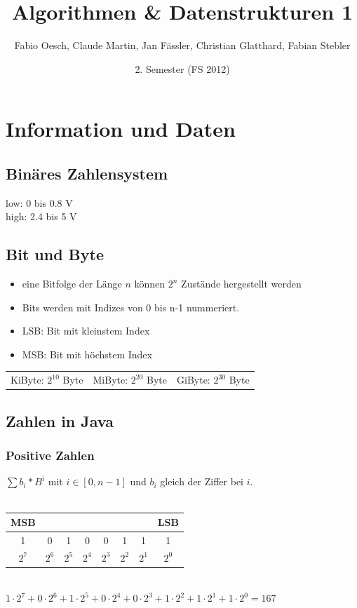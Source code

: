 \documentclass[a4paper,10pt]{article}
\author{Fabio Oesch, Claude Martin, Jan F\"assler, Christian Glatthard, Fabian Stebler}
\title{Algorithmen \& Datenstrukturen 1}
\date{2. Semester (FS 2012)}
\begin{document}
\maketitle
\thispagestyle{fancy}

\newpage


\tableofcontents	  	


\newpage
\setcounter{page}{1}

\section{Information und Daten}
\subsection{Bin\"ares Zahlensystem}
low: 0 bis 0.8 V\\
high: 2.4 bis 5 V\\
\subsection{Bit und Byte}
\begin{itemize}
\item eine Bitfolge der L\"ange $n$ k\"onnen $2^n$ Zust\"ande hergestellt werden
\item Bits werden mit Indizes von 0 bis n-1 nummeriert.
\item LSB: Bit mit kleinstem Index
\item MSB: Bit mit h\"ochstem Index
\end{itemize}
\begin{tabular}{l l l }
	KiByte: $2^{10}$ Byte &
	MiByte: $2^{20}$ Byte &
	GiByte: $2^{30}$ Byte
\end{tabular}

\subsection{Zahlen in Java}
\subsubsection{Positive Zahlen}
$\sum {b_i * B^i}$ mit $i \in [0,n-1]$ und $b_i$ gleich der Ziffer bei $i$. \\\\
\begin{tabular}{|c|c|c|c|c|c|c|c|}
\multicolumn{1}{c}{MSB}&\multicolumn{6}{c}{}&\multicolumn{1}{c}{LSB}\\ \hline
1&0&1&0&0&1&1&1\\\hline
\multicolumn{1}{c}{$2^7$}&\multicolumn{1}{c}{$2^6$}&\multicolumn{1}{c}{$2^5$}&\multicolumn{1}{c}{$2^4$}&\multicolumn{1}{c}{$2^3$}&\multicolumn{1}{c}{$2^2$}&\multicolumn{1}{c}{$2^1$}&\multicolumn{1}{c}{$2^0$}\\
\end{tabular}\\
$1\cdot 2^7+0\cdot 2^6+1\cdot 2^5+0\cdot 2^4+0\cdot 2^3+1\cdot 2^2+1\cdot 2^1+1\cdot 2^0=167$
\end{document}
